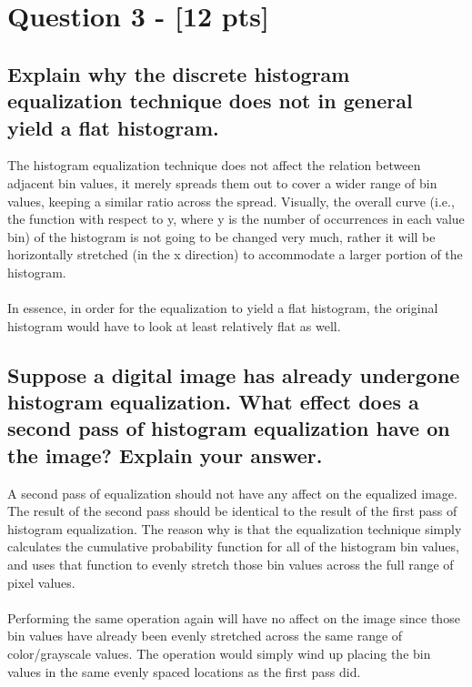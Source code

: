 \documentclass[11pt]{article}
\begin{document}
\section{Question 3 - [12 pts]}

\subsection{Explain why the discrete histogram equalization technique does not in general yield a flat histogram.}
The histogram equalization technique does not affect the relation between adjacent bin values, it merely spreads them out to cover a wider range of bin values, keeping a similar ratio across the spread. Visually, the overall curve (i.e., the function with respect to y, where y is the number of occurrences in each value bin) of the histogram is not going to be changed very much, rather it will be horizontally stretched (in the x direction) to accommodate a larger portion of the histogram.\\
\\
In essence, in order for the equalization to yield a flat histogram, the original histogram would have to look at least relatively flat as well.

\subsection{Suppose a digital image has already undergone histogram equalization. What effect does a second pass of histogram equalization have on the image? Explain your answer.}
A second pass of equalization should not have any affect on the equalized image. The result of the second pass should be identical to the result of the first pass of histogram equalization. The reason why is that the equalization technique simply calculates the cumulative probability function for all of the histogram bin values, and uses that function to evenly stretch those bin values across the full range of pixel values.\\
\\
Performing the same operation again will have no affect on the image since those bin values have already been evenly stretched across the same range of color/grayscale values. The operation would simply wind up placing the bin values in the same evenly spaced locations as the first pass did.
\end{document}
